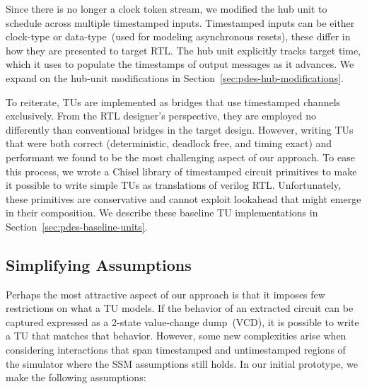 Since there is no longer a clock token stream, we modified the hub unit to
schedule across multiple timestamped inputs. Timestamped inputs can be either
clock-type or data-type~(used for modeling asynchronous resets), these differ
in how they are presented to target RTL. The hub unit explicitly tracks target
time, which it uses to populate the timestamps of output messages as it advances.
We expand on the hub-unit modifications in Section~\ref{sec:pdes-hub-modifications}.

To reiterate, TUs are implemented as bridges that use timestamped channels
exclusively. From the RTL designer's perspective, they are employed no
differently than conventional bridges in the target design.  However, writing
TUs that were both correct (deterministic, deadlock free, and timing exact) and
performant we found to be the most challenging aspect of our approach.  To ease
this process, we wrote a Chisel library of timestamped circuit primitives to
make it possible to write simple TUs as translations of verilog RTL.
Unfortunately, these primitives are conservative and cannot exploit lookahead
that might emerge in their composition. We describe these baseline TU
implementations in Section~\ref{sec:pdes-baseline-units}.

\subsection{Simplifying Assumptions}\label{sec:pdes-assumptions}

Perhaps the most attractive aspect of our approach is that it imposes few
restrictions on what a TU models. If the behavior of an extracted circuit can
be captured expressed as a 2-state value-change dump~(VCD), it is possible to write a
TU that matches that behavior. However, some new complexities arise when
considering interactions that span timestamped and untimestamped regions of the
simulator where the SSM assumptions still holds. In our initial prototype, we
make the following assumptions:


